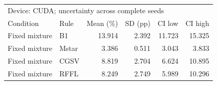 \begin{tabular}{llrrrr}
\toprule
\multicolumn{6}{l}{Device: CUDA; uncertainty across complete seeds} \\
Condition & Rule & Mean (\%) & SD (pp) & CI low & CI high \\
\midrule
Fixed mixture & B1 & 13.914 & 2.392 & 11.723 & 15.325 \\
Fixed mixture & Mstar & 3.386 & 0.511 & 3.043 & 3.833 \\
Fixed mixture & CGSV & 8.819 & 2.704 & 6.624 & 10.895 \\
Fixed mixture & RFFL & 8.249 & 2.749 & 5.989 & 10.296 \\
\bottomrule
\end{tabular}
